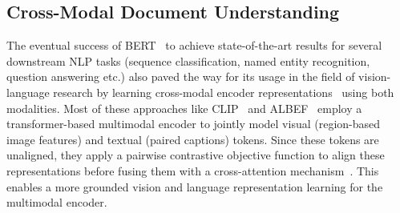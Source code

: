 \documentclass[preprint,review,12pt]{elsarticle}
\begin{document}
\subsection{Cross-Modal Document Understanding}
The eventual success of BERT~\cite{devlin2018bert} to achieve state-of-the-art results for several downstream NLP tasks (sequence classification, named entity recognition, question answering etc.) also paved the way for its usage in the field of vision-language research by learning cross-modal encoder representations~\cite{lu2019vilbert, tan2019lxmert} using both modalities. Most of these approaches like CLIP~\cite{radford2021learning} and ALBEF~\cite{li2021align} employ a transformer-based multimodal encoder to jointly model visual (region-based image features) and textual (paired captions) tokens. Since these tokens are unaligned, they apply a pairwise contrastive objective function to align these representations before fusing them with a cross-attention mechanism~\cite{vaswani2017attention}. This enables a more grounded vision and language representation learning for the multimodal encoder.  
\end{document}
